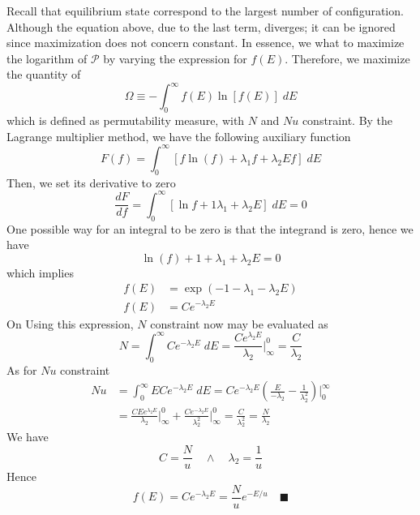 \documentclass[../../../Main.tex]{subfiles}
\begin{document}
Recall that equilibrium state correspond to the largest number of configuration. Although the equation above, due to the last term, diverges; it can be ignored since maximization does not concern constant. In essence, we what to maximize the logarithm of $\mathcal{P}$ by varying the expression for $f(E)$. Therefore, we maximize the quantity of 
\begin{equation*}
    \Omega\equiv-\int_{0}^{\infty}f(E)\ln [f(E)]\;dE
\end{equation*}
which is defined as permutability measure, with $N$ and $Nu$ constraint. By the Lagrange multiplier method, we have the following auxiliary function
\begin{equation*}
    F(f)=\int_{0}^{\infty}[f\ln (f)+\lambda_1f+\lambda_2Ef]\;dE
\end{equation*}
Then, we set its derivative to zero
\begin{equation*}
    \frac{dF}{df}=\int_{0}^{\infty}[\ln f+1\lambda_1+\lambda_2E]\;dE=0
\end{equation*}
One possible way for an integral to be zero is that the integrand is zero, hence we have 
\begin{equation*}
    \ln (f)+1+\lambda_1+\lambda_2E=0
\end{equation*}
which implies
\begin{align*}
    f(E)&=\exp (-1-\lambda_1-\lambda_2E)\\
    f(E)&=Ce^{-\lambda_2E}
\end{align*}
On Using this expression, $N$ constraint now may be evaluated as 
\begin{equation*}
    N=\int_{0}^{\infty}Ce^{-\lambda_2E}\;dE=\frac{Ce^{\lambda_2E}}{\lambda_2}\bigg|_{\infty}^{0}=\frac{C}{\lambda_2}
\end{equation*}
As for $Nu$ constraint
\begin{align*}
    Nu&=\int_{0}^{\infty}ECe^{-\lambda_2E}\;dE= Ce^{-\lambda_2E}\left( \frac{E}{-\lambda_2}-\frac{1}{\lambda_2^2}\right) \bigg|_{0}^{\infty} \\
    &= \frac{CEe^{\lambda_2E}}{\lambda_2}\bigg|_{\infty}^{0} + \frac{Ce^{-\lambda_2E}}{\lambda_2^2}\bigg|_{\infty}^{0}=\frac{C}{\lambda_2^2}=\frac{N}{\lambda_2}
\end{align*}
We have
\begin{equation*}
    C=\frac{N}{u}\quad\land\quad\lambda_2=\frac{1}{u}
\end{equation*}
Hence
\begin{equation*}
    f(E)=Ce^{-\lambda_2E}=\frac{N}{u}e^{-E/u}\quad\blacksquare
\end{equation*}
\end{document}
